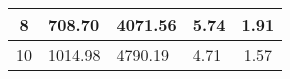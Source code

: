 \begin{table}
\begin{tabular}{|c|l|l|l|c|}
8                                                                                                          & 708.70                                                                                                                                                                   & 4071.56                                                                                                                                    & 5.74                            & 1.91        \\ \hline
10                                                                                                         & 1014.98                                                                                                                                                                 & 4790.19                                                                                                                                  & 4.71                            & 1.57         \\ \hline
\end{tabular}
\end{table}

